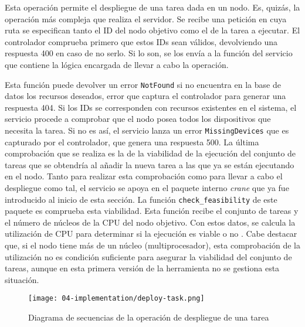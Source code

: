 \begin{itemize}
          Esta operación permite el despliegue de una tarea dada en un nodo. Es,
          quizás, la operación más compleja que realiza el servidor. Se recibe
          una petición en cuya ruta se especifican tanto el ID del nodo objetivo
          como el de la tarea a ejecutar. El controlador comprueba primero que
          estos IDs sean válidos, devolviendo una respuesta 400 en caso de no
          serlo. Si lo son, se los envía a la función del servicio que contiene
          la lógica encargada de llevar a cabo la operación.

          Esta función puede devolver un error \texttt{NotFound} si no encuentra
          en la base de datos los recursos deseados, error que captura el
          controlador para generar una respuesta 404. Si los IDs se corresponden
          con recursos existentes en el sistema, el servicio procede a comprobar
          que el nodo posea todos los dispositivos que necesita la tarea. Si no
          es así, el servicio lanza un error \texttt{MissingDevices} que es
          capturado por el controlador, que genera una respuesta 500. La última
          comprobación que se realiza es la de la viabilidad de la ejecución del
          conjunto de tareas que se obtendría al añadir la nueva tarea a las que
          ya se están ejecutando en el nodo. Tanto para realizar esta
          comprobación como para llevar a cabo el despliegue como tal, el
          servicio se apoya en el paquete interno \textit{crane} que ya fue
          introducido al inicio de esta sección. La función
          \texttt{check\_feasibility} de este paquete es comprueba esta
          viabilidad. Esta función recibe el conjunto de tareas y el número de
          núcleos de la CPU del nodo objetivo. Con estos datos, se calcula la
          utilización de CPU para determinar si la ejecución es viable o no
          \cite{zhang_schedulability_2009}. Cabe destacar que, si el nodo tiene
          más de un núcleo (multiprocesador), esta comprobación de la
          utilización no es condición suficiente para asegurar la viabilidad del
          conjunto de tareas, aunque en esta primera versión de la herramienta
          no se gestiona esta situación.

          \begin{figure}
              \centering
              \texttt{[image: 04-implementation/deploy-task.png]}
              \caption{Diagrama de secuencias de la operación de despliegue de una tarea}
              \label{fig:04-deploy_task}
          \end{figure}


\end{itemize}
